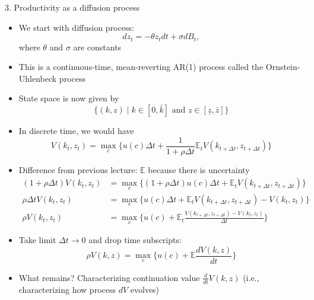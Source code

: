 \documentclass[10pt]{beamer}
\begin{document}
\begin{frame}{3. Productivity as a diffusion process}
\begin{itemize}
\item We start with diffusion process:
\begin{equation*}
	dz_t = - \theta z_t dt + \sigma dB_t,
\end{equation*}
where $\theta$ and $\sigma$ are constants

\item This is a continuous-time, mean-reverting AR(1) process called the Ornstein-Uhlenbeck process

\item State space is now given by
\begin{equation*}
	\Big\{ (k, z) \mid k \in [0, \bar k] \text{ and } z \in [\underline z, \bar z] \Big\}
\end{equation*}
\end{itemize}
\end{frame}


\begin{frame}{}
\begin{itemize}
\item In discrete time, we would have 
\begin{equation*}
	V(k_t, z_t) = \max_c \Big\{ u(c) \Delta t + \frac{1}{1 + \rho \Delta t} \mathbb{E}_t V(k_{t + \Delta t}, z_{t + \Delta t} ) \Big\}
\end{equation*}

\item Difference from previous lecture: $\mathbb E$ because there is uncertainty
\begin{align*}
	(1 + \rho \Delta t) V(k_t, z_t) &= \max_c \Big\{ (1 + \rho \Delta t) u(c) \Delta t+ \mathbb{E}_t V(k_{t + \Delta t}, z_{t + \Delta t})  \Big\} \\
	\rho \Delta t V(k_t, z_t) &= \max_c \Big\{ u(c) \Delta t+ \mathbb{E}_t V(k_{t + \Delta t}, z_{t + \Delta t} ) - V(k_t, z_t) \Big\} \\
	\rho V(k_t, z_t) &= \max_c \Big\{ u(c) + \mathbb{E}_t \frac{V(k_{t + \Delta t}, z_{t + \Delta t} ) - V(k_t, z_t)}{\Delta t} \Big\}
\end{align*}

\item Take limit $\Delta t \to 0$ and drop time subscripts: 
\begin{equation*}
	\rho V(k, z) = \max_c \Big\{ u(c) + \mathbb{E} \frac{d V(k, z)}{dt} \Big\}
\end{equation*}

\item What remains? Characterizing continuation value $\frac{d}{dt} V(k, z)$ (i.e., characterizing how process $dV$ evolves)

\end{itemize}
\end{frame}
\end{document}
